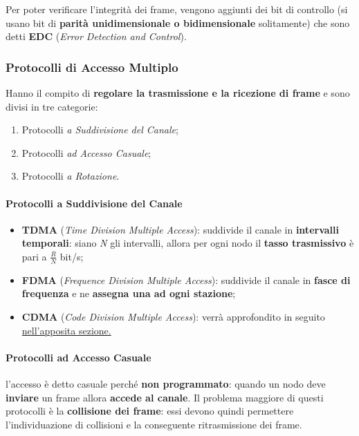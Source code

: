 \documentclass[a4paper]{article}
\begin{document}
					Per poter verificare l'integrità dei frame, vengono aggiunti dei bit di controllo (si usano bit di \textbf{parità unidimensionale o bidimensionale} solitamente) che sono detti \textbf{EDC} (\emph{Error Detection and Control}).
					
			
			\subsubsection{Protocolli di Accesso Multiplo}
				Hanno il compito di \textbf{regolare la trasmissione e la ricezione di frame} e sono divisi in tre categorie:
				\begin{enumerate}
					\item Protocolli \emph{a Suddivisione del Canale};
					\item Protocolli \emph{ad Accesso Casuale};
					\item Protocolli \emph{a Rotazione}.
				\end{enumerate}
				
				\paragraph{Protocolli a Suddivisione del Canale}
					\begin{itemize}
						\item \textbf{TDMA} (\emph{Time Division Multiple Access}): suddivide il canale in \textbf{intervalli temporali}: siano \emph{N} gli intervalli, allora per ogni nodo il \textbf{tasso trasmissivo} è pari a $ \frac{R}{N} $ bit/s;
						\item \textbf{FDMA} (\emph{Frequence Division Multiple Access}): suddivide il canale in \textbf{fasce di frequenza} e ne \textbf{assegna una ad ogni stazione};
						\item \textbf{CDMA} (\emph{Code Division Multiple Access}): verrà approfondito in seguito \hyperref[sec:CDMA]{nell'apposita sezione.}
					\end{itemize}					
					
				\paragraph{Protocolli ad Accesso Casuale}
					l'accesso è detto casuale perché \textbf{non programmato}: quando un nodo deve \textbf{inviare} un frame allora \textbf{accede al canale}. Il problema maggiore di questi protocolli è la \textbf{collisione dei frame}: essi devono quindi permettere l'individuazione di collisioni e la conseguente ritrasmissione dei frame.
					
\end{document}
